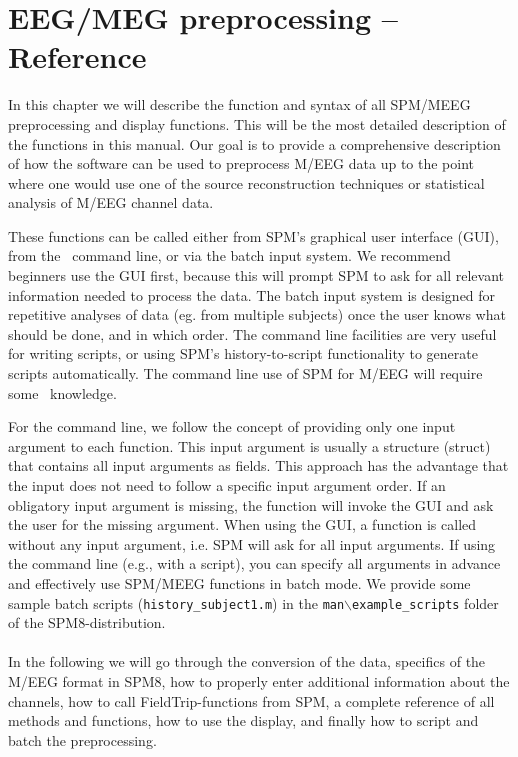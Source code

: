 \chapter{EEG/MEG preprocessing -- Reference \label{Chap:eeg:preprocessing}}

In this chapter we will describe the function and syntax of all SPM/MEEG preprocessing and display functions. This will be the most detailed description of the functions in this manual. Our goal is to provide a comprehensive description of how the software can be used to preprocess M/EEG data up to the point where one would use one of the source reconstruction techniques or statistical analysis of M/EEG channel data.

These functions can be called either from SPM's graphical user interface (GUI), from the \matlab\ command line, or via the batch input system. We recommend beginners use the GUI first, because this will prompt SPM to ask for all relevant information needed to process the data. The batch input system is designed for repetitive analyses of data (eg. from multiple subjects) once the user knows what should be done, and in which order. The command line facilities are very useful for writing scripts, or using SPM's history-to-script functionality to generate scripts automatically. The command line use of SPM for M/EEG will require some \matlab\ knowledge.

For the command line, we follow the concept of providing only one input argument to each function. This input argument is usually a structure (struct) that contains all input arguments as fields. This approach has the advantage that the input does not need to follow a specific input argument order. If an obligatory input argument is missing, the function will invoke the GUI and ask the user for the missing argument. When using the GUI, a function is called without any input argument, i.e. SPM will ask for all input arguments. If using the command line (e.g., with a script), you can specify all arguments in advance and effectively use SPM/MEEG functions in batch mode. We provide some sample batch scripts (\texttt{history_subject1.m}) in the \texttt{man$\backslash$example\_scripts} folder of the SPM8-distribution.
\\
\\
In the following we will go through the conversion of the data, specifics of the M/EEG format in SPM8, how to properly enter additional information about the channels, how to call FieldTrip-functions from SPM, a complete reference of all methods and functions, how to use the display, and finally how to script and batch the preprocessing.

